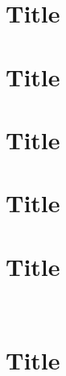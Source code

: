 \documentclass[a4paper,12pt,twoside,openright]{report}
\begin{document}
\pagestyle{empty}
\singlespacing

\onehalfspacing

\singlespacing


\setcounter{page}{0}
\pagestyle{plain}
\tableofcontents
\listoffigures
\listoftables

\onehalfspacing


\chapter{Title}
\setcounter{page}{1} 

\chapter{Title} 

\chapter{Title}

\chapter{Title}

\chapter{Title}
\
\chapter{Title}


\appendix
\singlespacing

 
% 
\end{document}
